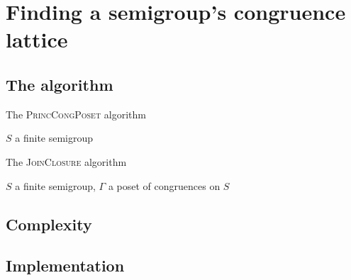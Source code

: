 \chapter{Finding a semigroup's congruence lattice}
\label{chap:lattice}

\lipsum[3]

\section{The algorithm}

\begin{algorithm}
  \caption{The \textsc{PrincCongPoset} algorithm}
  \label{alg:princ-cong-poset}
  \begin{algorithmic}[1]
    \Require $S$ a finite semigroup
    \EndProcedure
  \end{algorithmic}
\end{algorithm}

\begin{algorithm}
\caption{The \textsc{JoinClosure} algorithm}
\label{alg:join-closure}
\begin{algorithmic}[1]
    \Require $S$ a finite semigroup, $\Gamma$ a poset of congruences on $S$
    \EndProcedure
\end{algorithmic}
\end{algorithm}

\section{Complexity}

\section{Implementation}
